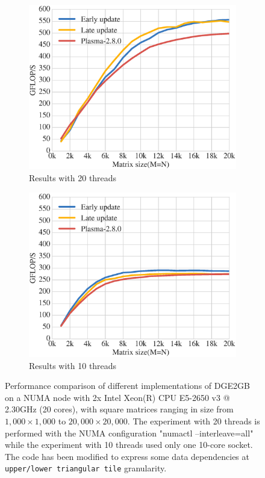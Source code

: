 \begin{figure}[h!]
  \begin{subfigure}[t]{0.5 \textwidth}
    \includegraphics[width=\textwidth]{fig/dge2gb_HASWELL_HACK}
    \caption{\label{fig:dge2gb_HASWELL_20}
      Results with 20 threads}
  \end{subfigure}
  \hfill
  \begin{subfigure}[t]{0.5 \textwidth}
    \includegraphics[width=\textwidth]{fig/dge2gb_HASWELL_HACK_10}
    \caption{\label{fig:dge2gb_HASWELL_10}
      Results with 10 threads}
  \end{subfigure}
  \caption{Performance comparison of different implementations of
    DGE2GB on a NUMA node with
    2x Intel Xeon(R) CPU E5-2650 v3 @ 2.30GHz (20 cores),
    with square matrices ranging in size from $1,000 \times 1,000$ to
    $20,000 \times 20,000$. The experiment with 20 threads is performed
    with the NUMA configuration "numactl --interleave=all" while the
    experiment with 10 threads used only one 10-core socket.
    The code has been modified to  express some
    data dependencies at \texttt{upper/lower triangular tile} granularity.}
  \label{fig:dge2gb_HASWELL}
\end{figure}

